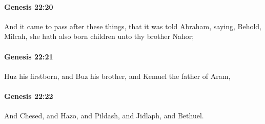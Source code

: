 		\paragraph{Genesis 22:20} %
			\label{GENESIS-22-20}

			And it came to pass after these things, that it was told Abraham, saying, Behold, Milcah, she hath also born children unto thy brother Nahor;


		\paragraph{Genesis 22:21} %
			\label{GENESIS-22-21}

			Huz his firstborn, and Buz his brother, and Kemuel the father of Aram,


		\paragraph{Genesis 22:22} %
			\label{GENESIS-22-22}

			And Chesed, and Hazo, and Pildash, and Jidlaph, and Bethuel.


